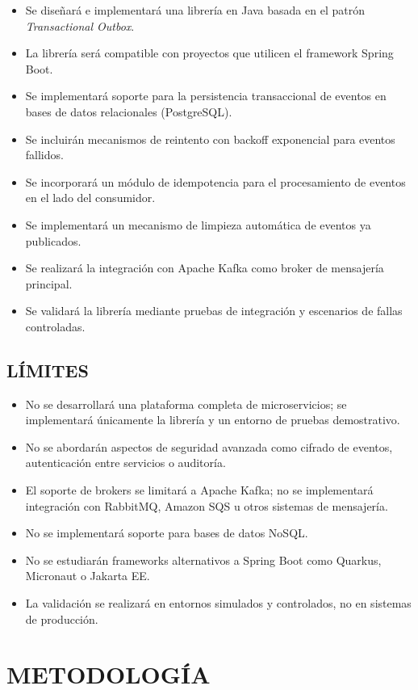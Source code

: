 \begin{itemize}
    \item Se diseñará e implementará una librería en Java basada en el patrón \textit{Transactional Outbox}.
    \item La librería será compatible con proyectos que utilicen el framework Spring Boot.
    \item Se implementará soporte para la persistencia transaccional de eventos en bases de datos relacionales (PostgreSQL).
    \item Se incluirán mecanismos de reintento con backoff exponencial para eventos fallidos.
    \item Se incorporará un módulo de idempotencia para el procesamiento de eventos en el lado del consumidor.
    \item Se implementará un mecanismo de limpieza automática de eventos ya publicados.
    \item Se realizará la integración con Apache Kafka como broker de mensajería principal.
    \item Se validará la librería mediante pruebas de integración y escenarios de fallas controladas.
\end{itemize}

\subsection{LÍMITES}

\begin{itemize}
    \item No se desarrollará una plataforma completa de microservicios; se implementará únicamente la librería y un entorno de pruebas demostrativo.
    \item No se abordarán aspectos de seguridad avanzada como cifrado de eventos, autenticación entre servicios o auditoría.
    \item El soporte de brokers se limitará a Apache Kafka; no se implementará integración con RabbitMQ, Amazon SQS u otros sistemas de mensajería.
    \item No se implementará soporte para bases de datos NoSQL.
    \item No se estudiarán frameworks alternativos a Spring Boot como Quarkus, Micronaut o Jakarta EE.
    \item La validación se realizará en entornos simulados y controlados, no en sistemas de producción.
\end{itemize}

\section{METODOLOGÍA}

